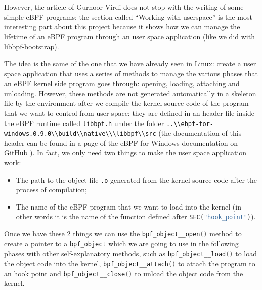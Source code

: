 However, the article of Gurnoor Virdi does not stop with the writing of some simple eBPF programs: the section called ``Working with userspace'' is the most interesting part about this project because it shows how we can manage the lifetime of an eBPF program through an user space application (like we did with libbpf-bootstrap).

The idea is the same of the one that we have already seen in Linux: create a user space application that uses a series of methods to manage the various phases that an eBPF kernel side program goes through: opening, loading, attaching and unloading.
However, these methods are not generated automatically in a skeleton file by the environment after we compile the kernel source code of the program that we want to control from user space: they are defined in an header file inside the eBPF runtime called \colorbox{backcolour}{\lstinline[style=commandline, language=bash]|libbpf.h|} under the folder
\colorbox{backcolour}{\lstinline[style=commandline, language=bash]|..\\ebpf-for-windows.0.9.0\\build\\native\\\libbpf\\src|} (the documentation of this header can be found in a page of the eBPF for Windows documentation on GitHub \cite{eBPFWinlibbpfHeader}).
In fact, we only need two things to make the user space application work:

\begin{itemize}
	\item 
		The path to the object file \colorbox{backcolour}{\lstinline[style=commandline, language=bash]|.o|} generated from the kernel source code after the process of compilation;
	\item 
		The name of the eBPF program that we want to load into the kernel (in other words it is the name of the function defined after \colorbox{backcolour}{\lstinline[style=cstyle, language=C]|SEC("hook_point")|}).
\end{itemize}

Once we have these 2 things we can use the \colorbox{backcolour}{\lstinline[style=cstyle, language=C]|bpf_object__open()|} method to create a pointer to a \colorbox{backcolour}{\lstinline[style=cstyle, language=C]|bpf_object|} which we are going to use in the following phases with other self-explanatory methods, such as \colorbox{backcolour}{\lstinline[style=cstyle, language=C]|bpf_object__load()|} to load the object code into the kernel, \colorbox{backcolour}{\lstinline[style=cstyle, language=C]|bpf_object__attach()|} to attach the program to an hook point and \colorbox{backcolour}{\lstinline[style=cstyle, language=C]|bpf_object__close()|} to unload the object code from the kernel.

